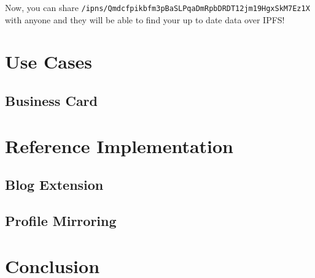 \documentclass{article}
\begin{document}
Now, you can share \texttt{/ipns/Qmdcfpikbfm3pBaSLPqaDmRpbDRDT12jm19HgxSkM7Ez1X} with anyone and they will be able to find your up to date data over IPFS!



\section{Use Cases}

\subsection{Business Card}

\subsection{}

\section{Reference Implementation}

\subsection{Blog Extension}

\subsection{Profile Mirroring}

\section{Conclusion}
\end{document}
